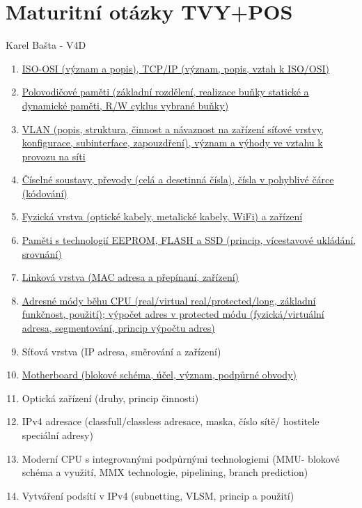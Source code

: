 \documentclass[a4paper,11pt]{article}
\begin{document}

\section*{Maturitní otázky TVY+POS}
\begin{center}
  \Large Karel Bašta - V4D
\end{center}
\begin{enumerate}
  \item \hyperref[sec:isoosi]{ISO-OSI (význam a popis), TCP/IP (význam, popis, vztah k ISO/OSI)}
  \item \hyperref[sec:polpameti]{Polovodičové paměti (základní rozdělení, realizace buňky statické a dynamické paměti, R/W cyklus vybrané buňky)}
  \item \hyperref[sec:vlan]{VLAN (popis, struktura, činnost a návaznost na zařízení síťové vrstvy, konfigurace, subinterface, zapouzdření), význam a výhody ve vztahu k provozu na síti}
  \item \hyperref[sec:ciselnesoustavy]{Číselné soustavy, převody (celá a desetinná čísla), čísla v pohyblivé čárce (kódování)}
  \item \hyperref[sec:fyzicka-vrstva]{Fyzická vrstva (optické kabely, metalické kabely, WiFi) a zařízení}
  \item \hyperref[sec:eeprom-flash-ssd]{Paměti s technologií EEPROM, FLASH a SSD (princip, vícestavové ukládání, srovnání)}
  \item \hyperref[sec:linkova-vrstva]{Linková vrstva (MAC adresa a přepínaní, zařízení)}
  \item \hyperref[sec:adresnemody]{Adresné módy běhu CPU (real/virtual real/protected/long, základní funkčnost, použití); výpočet adres v protected módu (fyzická/virtuální adresa, segmentování, princip výpočtu adres)}
  \item Síťová vrstva (IP adresa, směrování a zařízení)
  \item \hyperref[sec:motherboard]{Motherboard (blokové schéma, účel, význam, podpůrné obvody)}
  \item Optická zařízení (druhy, princip činnosti)
  \item IPv4 adresace (classfull/classless adresace, maska, číslo sítě/ hostitele speciální adresy)
  \item Moderní CPU s integrovanými podpůrnými technologiemi (MMU- blokové schéma a využití, MMX technologie, pipelining, branch prediction)
  \item Vytváření podsítí v IPv4 (subnetting, VLSM, princip a použití)

\end{enumerate}
\end{document}
